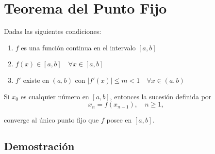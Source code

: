 \documentclass[openany]{book}
\providecommand{\tightlist}{%
  \setlength{\itemsep}{0pt}\setlength{\parskip}{0pt}}
\begin{document}
\hypertarget{teorema-del-punto-fijo-1}{%
\section*{Teorema del Punto Fijo}\label{teorema-del-punto-fijo-1}}

Dadas las siguientes condiciones:

\begin{enumerate}
\def\labelenumi{\alph{enumi}.}
\tightlist
\item
  \(f\) es una función continua en el intervalo \([a, b]\)
\item
  \(f(x) \in [a, b] \quad \forall x \in [a, b]\)
\item
  \(f'\) existe en \((a, b)\) con \(|f'(x)| \le m < 1 \quad \forall x \in (a, b)\)
\end{enumerate}

Si \(x_0\) es cualquier número en \([a, b]\), entonces la sucesión definida por
\[ x_n = f(x_{n-1}), \quad n \ge 1,\]

converge al único punto fijo que \(f\) posee en \([a, b]\).

\hypertarget{demostraciuxf3n}{%
\subsection*{Demostración}\label{demostraciuxf3n}}
\end{document}
